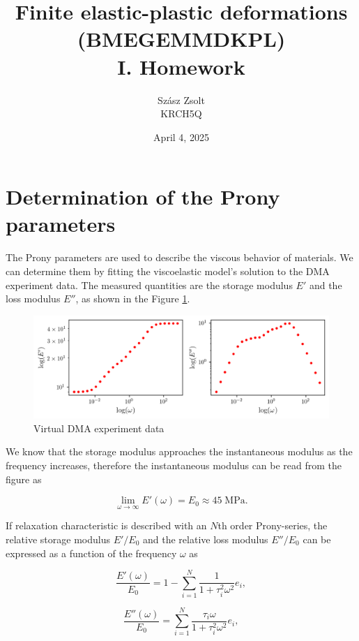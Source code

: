 \documentclass[12pt,a4paper]{article}
\title{Finite elastic-plastic deformations\\(BMEGEMMDKPL)\\I. Homework}
\author{Szász Zsolt\\KRCH5Q}
\date{April 4, 2025}
\begin{document}
\maketitle{}

\newpage

\section{Determination of the Prony parameters}

The Prony parameters are used to describe the viscous behavior of materials. We can determine them by fitting the viscoelastic model's solution to the DMA experiment data. The measured quantities are the storage modulus $E'$ and the loss modulus $E''$, as shown in the Figure \ref{fig:experiment}.


\begin{figure}[h]
    \centering
    \includegraphics[scale=0.875]{figures/data.png}
    \caption{Virtual DMA experiment data}
    \label{fig:experiment}
\end{figure}

We know that the storage modulus approaches the instantaneous modulus as the frequency increases, therefore the instantaneous modulus can be read from the figure as

\begin{equation}
    \lim_{\omega\rightarrow\infty}E'(\omega) = E_0 \approx 45\;\text{MPa}.
\end{equation}

If relaxation characteristic is described with an $N$th order Prony-series, the relative storage modulus $E'/E_0$ and the relative loss modulus $E''/E_0$ can be expressed as a function of the frequency $\omega$ as

\begin{equation}
\frac{E'(\omega)}{E_0} = 
1 - \sum_{i=1}^N \frac{1}{1+\tau_i^2 \omega^2}e_i,
\end{equation}

\begin{equation}
\frac{E''(\omega)}{E_0} = 
\sum_{i=1}^N \frac{\tau_i \omega}{1+\tau_i^2 \omega^2}e_i,
\end{equation}
\end{document}
